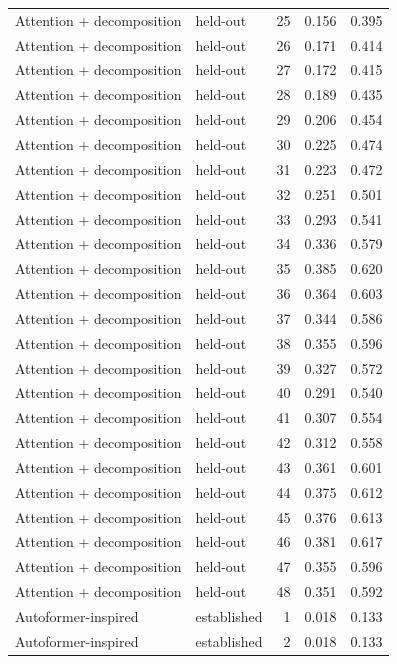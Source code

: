 \begin{tabular}{llrrr}
Attention + decomposition & held-out & 25 & 0.156 & 0.395 \\
Attention + decomposition & held-out & 26 & 0.171 & 0.414 \\
Attention + decomposition & held-out & 27 & 0.172 & 0.415 \\
Attention + decomposition & held-out & 28 & 0.189 & 0.435 \\
Attention + decomposition & held-out & 29 & 0.206 & 0.454 \\
Attention + decomposition & held-out & 30 & 0.225 & 0.474 \\
Attention + decomposition & held-out & 31 & 0.223 & 0.472 \\
Attention + decomposition & held-out & 32 & 0.251 & 0.501 \\
Attention + decomposition & held-out & 33 & 0.293 & 0.541 \\
Attention + decomposition & held-out & 34 & 0.336 & 0.579 \\
Attention + decomposition & held-out & 35 & 0.385 & 0.620 \\
Attention + decomposition & held-out & 36 & 0.364 & 0.603 \\
Attention + decomposition & held-out & 37 & 0.344 & 0.586 \\
Attention + decomposition & held-out & 38 & 0.355 & 0.596 \\
Attention + decomposition & held-out & 39 & 0.327 & 0.572 \\
Attention + decomposition & held-out & 40 & 0.291 & 0.540 \\
Attention + decomposition & held-out & 41 & 0.307 & 0.554 \\
Attention + decomposition & held-out & 42 & 0.312 & 0.558 \\
Attention + decomposition & held-out & 43 & 0.361 & 0.601 \\
Attention + decomposition & held-out & 44 & 0.375 & 0.612 \\
Attention + decomposition & held-out & 45 & 0.376 & 0.613 \\
Attention + decomposition & held-out & 46 & 0.381 & 0.617 \\
Attention + decomposition & held-out & 47 & 0.355 & 0.596 \\
Attention + decomposition & held-out & 48 & 0.351 & 0.592 \\
Autoformer-inspired & established & 1 & 0.018 & 0.133 \\
Autoformer-inspired & established & 2 & 0.018 & 0.133 \\

\end{tabular}
